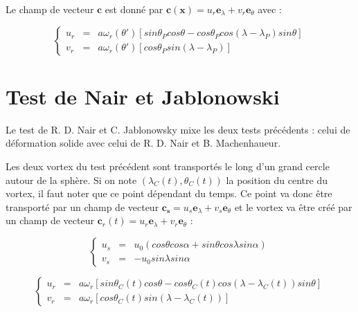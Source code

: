 Le champ de vecteur $\mathbf{c}$ est donné par $\mathbf{c}( \mathbf{x} ) = u_r \mathbf{e}_{\lambda} + v_r \mathbf{e}_{\theta}$ avec :

\begin{equation}
\left\lbrace
\begin{array}{rcl}
u_r & = & a \omega_r ( \theta' ) \left[ sin \theta_P cos \theta - cos \theta_P cos( \lambda - \lambda_P ) sin \theta \right] \\
v_r & = & a \omega_r ( \theta' ) \left[ cos \theta_P sin ( \lambda - \lambda_P) \right]
\end{array}
\right.
\end{equation}


\section{Test de Nair et Jablonowski}

Le test de R. D. Nair et C. Jablonowsky \cite{Nair2008} mixe les deux tests précédents : celui de déformation solide avec celui de R. D. Nair et B. Machenhaueur.

Les deux vortex du test précédent sont transportés le long d'un grand cercle autour de la sphère. Si on note $(\lambda_C(t), \theta_C(t))$ la position du centre du vortex, il faut noter que ce point dépendant du temps. Ce point va donc être transporté par un champ de vecteur $\mathbf{c_s} = u_s \mathbf{e}_{\lambda} + v_s \mathbf{e}_{\theta}$ et le vortex va être créé par un champ de vecteur $\mathbf{c}_r(t)=u_r \mathbf{e}_{\lambda} + v_r \mathbf{e}_{\theta}$ :

\begin{equation}
\left\lbrace
\begin{array}{rcl}
u_s & = & u_0 ( cos \theta cos \alpha + sin \theta cos \lambda sin \alpha ) \\
v_s & = & - u_0 sin \lambda sin \alpha 
\end{array}
\right.
\end{equation}

\begin{equation}
\left\lbrace
\begin{array}{rcl}
u_r & = & a \omega_r  \left[ sin \theta_C(t) cos \theta - cos \theta_C(t) cos( \lambda - \lambda_C(t) ) sin \theta \right] \\
v_r & = & a \omega_r  \left[ cos \theta_C(t) sin ( \lambda - \lambda_C(t)) \right]
\end{array}
\right.
\end{equation}

